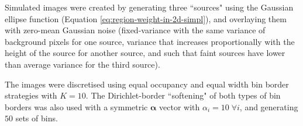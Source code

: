 \documentclass[
    ,final            %
  ]
  {aipproc}
\begin{document}
Simulated images were created by generating three ``sources" using the Gaussian ellipse function (Equation \ref{eq:region-weight-in-2d-simpl}), and 
overlaying them with zero-mean Gaussian noise (fixed-variance with the same variance of background pixels for one source, variance that increases proportionally with the height of the source for another source, and such that faint sources have lower than average variance for the third source). 

The images were discretised using equal occupancy and equal width bin border strategies with $K=10$. The Dirichlet-border ``softening" of both types of bin borders was also used with a symmetric $\boldsymbol{\alpha}$ vector with $\alpha_i = 10 \; \forall i$, and generating $50$ sets of bins.
\end{document}
